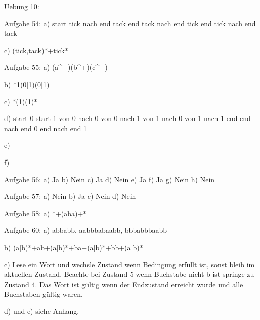 Uebung 10:

Aufgabe 54:
a)
start tick nach end tack
end tack nach end tick
end tick nach end tack

c)
(tick,tack)*+tick*


Aufgabe 55:
a)
(a^+)(b^+)(c^+)

b)
*1(0|1)(0|1)

c)
*(1)(1)*

d)
start 0
start 1
von 0 nach 0
von 0 nach 1
von 1 nach 0
von 1 nach 1 end
end nach end 0
end nach end 1

e)

f)


Aufgabe 56:
a) Ja
b) Nein
c) Ja
d) Nein
e) Ja
f) Ja
g) Nein
h) Nein


Aufgabe 57:
a) Nein
b) Ja
c) Nein
d) Nein


Aufgabe 58:
a) *+(aba)+*


Aufgabe 60:
a)
abbabb, aabbbabaabb, bbbabbbaabb

b)
(a|b)*+ab+(a|b)*+ba+(a|b)*+bb+(a|b)*

c)
Lese ein Wort und wechsle Zustand wenn Bedingung erfüllt ist, sonst bleib im aktuellen Zustand.
Beachte bei Zustand 5 wenn Buchstabe nicht b ist springe zu Zustand 4.
Das Wort ist gültig wenn der Endzustand erreicht wurde und alle Buchstaben gültig waren.

d) und e) siehe Anhang.